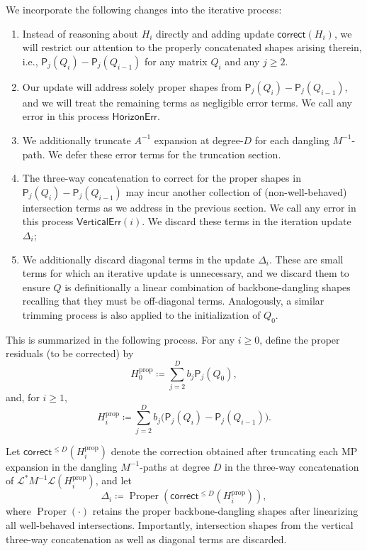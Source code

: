 \documentclass[12pt]{article}
\newcommand{\corr}{\mathsf{correct}}
\newcommand{\fp}{\mathsf{P}}
\newcommand{\calL}{\mathcal{L}}
\begin{document}
We incorporate the following changes into the iterative process:
\begin{enumerate}
	\item Instead of reasoning about $H_i$ directly and adding update $\corr(H_i)$, we will restrict our attention to the properly concatenated shapes arising therein, i.e., $\fp_j(Q_i) - \fp_j(Q_{i-1})$ for any matrix $Q_i$ and any $j\ge 2$. 
	\item Our update will address solely proper shapes from  $\fp_j(Q_i) - \fp_j(Q_{i-1})$, and we will treat the remaining terms as negligible error terms. We call any error in this process $\textsf{HorizonErr}$.	\item We additionally truncate $A^{-1}$ expansion at degree-$D$ for each dangling $M^{-1}$-path. We defer these error terms for the truncation section.
	\item The three-way concatenation to correct for the proper shapes in $\fp_j(Q_i) - \fp_j(Q_{i-1})$ may incur another collection of (non-well-behaved) intersection terms as we address in the previous section. We call any error in this process $\mathsf{VerticalErr}(i)$. We discard these terms in the iteration update $\Delta_i$;
	\item We additionally discard diagonal terms in the update $\Delta_i$. These are small terms for which an iterative update is unnecessary, and we discard them to ensure $Q$ is definitionally a linear combination of backbone-dangling shapes recalling that they must be off-diagonal terms. Analogously, a similar trimming process is also applied to the initialization of $Q_0$.
\end{enumerate}
This is summarized in the following process. For any $i\ge 0$, define the proper residuals (to be corrected) by
\[
    H_0^{\mathrm{prop}}
    \coloneqq
    \sum_{j=2}^{D}b_j\fp_j(Q_0),
\]
and, for \(i\geq1\),
\[
    H_i^{\mathrm{prop}}
    \coloneqq
    \sum_{j=2}^{D}b_j
    \bigl(\fp_j(Q_i)-\fp_j(Q_{i-1})\bigr).
\]

Let \(\corr^{\leq D}(H_i^{\mathrm{prop}})\) denote the correction obtained after truncating
each MP expansion in the dangling \(M^{-1}\)-paths at degree \(D\) in the three-way concatenation of \(
\calL^* M^{-1} \calL \left( H_i^{\mathrm{prop}} \right)
\), and
let
\[
    \Delta_i
    \coloneqq
    \operatorname{Proper}\!
    \left(\corr^{\leq D}(H_i^{\mathrm{prop}})\right),
\]
where \(\operatorname{Proper}(\cdot)\) retains the proper
backbone-dangling shapes after linearizing all well-behaved
intersections. Importantly, intersection shapes from the vertical three-way concatenation as well as diagonal terms are discarded.
 
\end{document}
